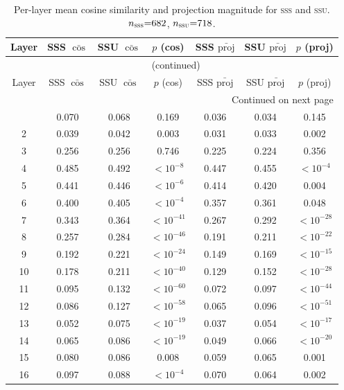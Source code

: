 \documentclass{article}
\newcommand{\ssu}{\textsc{ssu}}
\newcommand{\sss}{\textsc{sss}}
\begin{document}
\begin{longtable}{c ccc ccc}
\caption{Per-layer mean cosine similarity and projection magnitude for \sss{}
         and \ssu{}.  $n_{\sss}{=}682$, $n_{\ssu}{=}718$.}
\label{tab:agg_full}\\
\toprule
Layer
  & SSS $\bar{\cos}$ & SSU $\bar{\cos}$ & $p$ (cos)
  & SSS $\bar{\text{proj}}$ & SSU $\bar{\text{proj}}$ & $p$ (proj) \\
\midrule
\endfirsthead
\multicolumn{7}{c}{\tablename\ \thetable{} (continued)} \\
\toprule
Layer
  & SSS $\bar{\cos}$ & SSU $\bar{\cos}$ & $p$ (cos)
  & SSS $\bar{\text{proj}}$ & SSU $\bar{\text{proj}}$ & $p$ (proj) \\
\midrule
\endhead
\midrule
\multicolumn{7}{r}{\small Continued on next page}\\
\endfoot
\bottomrule
\endlastfoot
 1 & 0.070 & 0.068 & 0.169         &  0.036 & 0.034 & 0.145        \\
 2 & 0.039 & 0.042 & 0.003         &  0.031 & 0.033 & 0.002        \\
 3 & 0.256 & 0.256 & 0.746         &  0.225 & 0.224 & 0.356        \\
 4 & 0.485 & 0.492 & $<10^{-8}$    &  0.447 & 0.455 & $<10^{-4}$   \\
 5 & 0.441 & 0.446 & $<10^{-6}$    &  0.414 & 0.420 & 0.004        \\
 6 & 0.400 & 0.405 & $<10^{-4}$    &  0.357 & 0.361 & 0.048        \\
 7 & 0.343 & 0.364 & $<10^{-41}$   &  0.267 & 0.292 & $<10^{-28}$  \\
 8 & 0.257 & 0.284 & $<10^{-46}$   &  0.191 & 0.211 & $<10^{-22}$  \\
 9 & 0.192 & 0.221 & $<10^{-24}$   &  0.149 & 0.169 & $<10^{-15}$  \\
10 & 0.178 & 0.211 & $<10^{-40}$   &  0.129 & 0.152 & $<10^{-28}$  \\
11 & 0.095 & 0.132 & $<10^{-60}$   &  0.072 & 0.097 & $<10^{-44}$  \\
12 & 0.086 & 0.127 & $<10^{-58}$   &  0.065 & 0.096 & $<10^{-51}$  \\
13 & 0.052 & 0.075 & $<10^{-19}$   &  0.037 & 0.054 & $<10^{-17}$  \\
14 & 0.065 & 0.086 & $<10^{-19}$   &  0.049 & 0.066 & $<10^{-20}$  \\
15 & 0.080 & 0.086 & 0.008         &  0.059 & 0.065 & 0.001        \\
16 & 0.097 & 0.088 & $<10^{-4}$    &  0.070 & 0.064 & 0.002        \\

\end{longtable}
\end{document}
